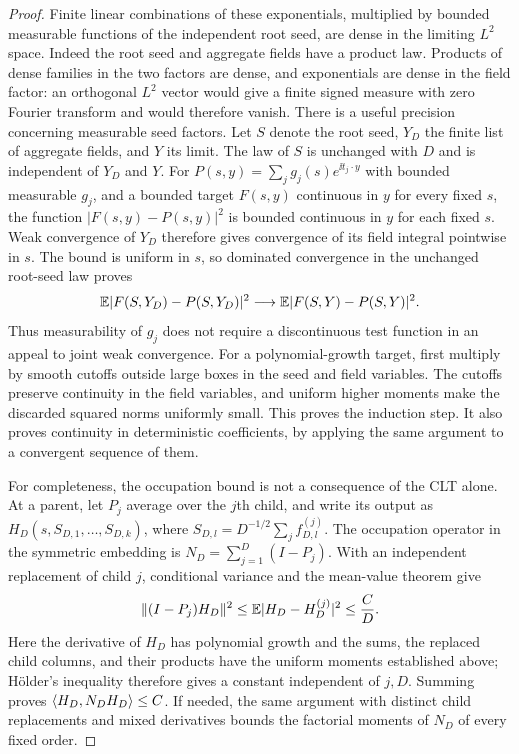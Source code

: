 \begin{proof}
Finite linear combinations of these exponentials, multiplied by
bounded measurable functions of the independent root seed, are dense
in the limiting $L^2$ space.  Indeed the root seed and aggregate
fields have a product law.  Products of dense families in the two
factors are dense, and exponentials are dense in the field factor:
an orthogonal $L^2$ vector would give a finite signed measure with
zero Fourier transform and would therefore vanish.
There is a useful precision concerning measurable seed factors.
Let $S$ denote the root seed, $Y_D$ the finite list of aggregate
fields, and $Y$ its limit.  The law of $S$ is unchanged with $D$ and
is independent of $Y_D$ and $Y$.  For
$P(s,y)=\sum_jg_j(s)e^{\ii t_j\cdot y}$ with bounded measurable
$g_j$, and a bounded target $F(s,y)$ continuous in $y$ for every
fixed $s$, the function $|F(s,y)-P(s,y)|^2$ is bounded continuous in
$y$ for each fixed $s$.  Weak convergence of $Y_D$ therefore gives
convergence of its field integral pointwise in $s$.  The bound is
uniform in $s$, so dominated convergence in the unchanged root-seed
law proves
\[
 \mathbb E|F(S,Y_D)-P(S,Y_D)|^2
       \longrightarrow\mathbb E|F(S,Y)-P(S,Y)|^2.
\]
Thus measurability of $g_j$ does not require a discontinuous test
function in an appeal to joint weak convergence.  For a
polynomial-growth target, first multiply by smooth cutoffs outside
large boxes in the seed and field variables.  The cutoffs preserve
continuity in the field variables, and uniform higher moments make
the discarded squared norms uniformly small.  This proves the induction
step.  It also proves
continuity in deterministic coefficients, by applying the same
argument to a convergent sequence of them.

For completeness, the occupation bound is not a consequence of the
CLT alone.  At a parent, let $P_j$ average over the $j$th child, and
write its output as $H_D(s,S_{D,1},\ldots,S_{D,k})$, where
$S_{D,l}=D^{-1/2}\sum_j f_{D,l}^{(j)}$.
The occupation operator in the symmetric embedding is
$N_D=\sum_{j=1}^D(I-P_j)$.  With an independent replacement of child
$j$, conditional variance and the mean-value theorem give
\[
 \lVert (I-P_j)H_D\rVert^2
 \le\mathbb E|H_D-H_D^{(j)}|^2\le\frac{C}{D}.
\]
Here the derivative of $H_D$ has polynomial growth and the sums,
the replaced child columns, and their products have the uniform
moments established above; H\"older's inequality therefore gives a
constant independent of $j,D$.  Summing proves
$\langle H_D,N_DH_D\rangle\le C$.  If needed, the same argument with
distinct child replacements and mixed derivatives bounds the
factorial moments of $N_D$ of every fixed order.


\end{proof}

